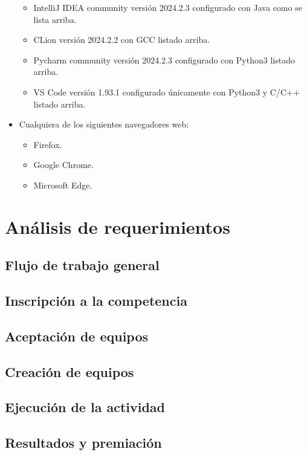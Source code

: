 \documentclass{article}
\begin{document}
\begin{itemize}
\begin{itemize}
          \item IntelliJ IDEA community versión 2024.2.3 configurado con Java como se lista arriba.
          \item CLion versión 2024.2.2 con GCC listado arriba.
          \item Pycharm community versión 2024.2.3 configurado con Python3 listado arriba.
          \item VS Code versión 1.93.1 configurado únicamente con Python3 y C/C++ listado arriba.
        \end{itemize}
  \item Cualquiera de los siguientes navegadores web:
        \begin{itemize}
          \item Firefox.
          \item Google Chrome.
          \item Microsoft Edge.
        \end{itemize}
\end{itemize}


\section{Análisis de requerimientos}

\subsection{Flujo de trabajo general}

\subsection{Inscripción a la competencia}

\subsection{Aceptación de equipos}

\subsection{Creación de equipos}

\subsection{Ejecución de la actividad}

\subsection{Resultados y premiación}
\end{document}
